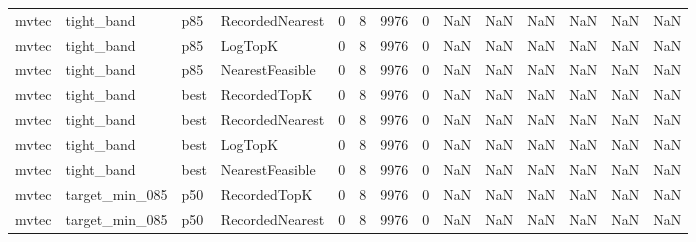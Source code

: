 \begin{tabular}{llllrrrrrrrrrr}
   mvtec &           tight\_band &    p85 & RecordedNearest &           0 &          8 &           9976 &                   0 &            NaN &             NaN &                       NaN &            NaN &                    NaN &                     NaN \\
   mvtec &           tight\_band &    p85 &         LogTopK &           0 &          8 &           9976 &                   0 &            NaN &             NaN &                       NaN &            NaN &                    NaN &                     NaN \\
   mvtec &           tight\_band &    p85 & NearestFeasible &           0 &          8 &           9976 &                   0 &            NaN &             NaN &                       NaN &            NaN &                    NaN &                     NaN \\
   mvtec &           tight\_band &   best &    RecordedTopK &           0 &          8 &           9976 &                   0 &            NaN &             NaN &                       NaN &            NaN &                    NaN &                     NaN \\
   mvtec &           tight\_band &   best & RecordedNearest &           0 &          8 &           9976 &                   0 &            NaN &             NaN &                       NaN &            NaN &                    NaN &                     NaN \\
   mvtec &           tight\_band &   best &         LogTopK &           0 &          8 &           9976 &                   0 &            NaN &             NaN &                       NaN &            NaN &                    NaN &                     NaN \\
   mvtec &           tight\_band &   best & NearestFeasible &           0 &          8 &           9976 &                   0 &            NaN &             NaN &                       NaN &            NaN &                    NaN &                     NaN \\
   mvtec &       target\_min\_085 &    p50 &    RecordedTopK &           0 &          8 &           9976 &                   0 &            NaN &             NaN &                       NaN &            NaN &                    NaN &                     NaN \\
   mvtec &       target\_min\_085 &    p50 & RecordedNearest &           0 &          8 &           9976 &                   0 &            NaN &             NaN &                       NaN &            NaN &                    NaN &                     NaN \\

\end{tabular}
